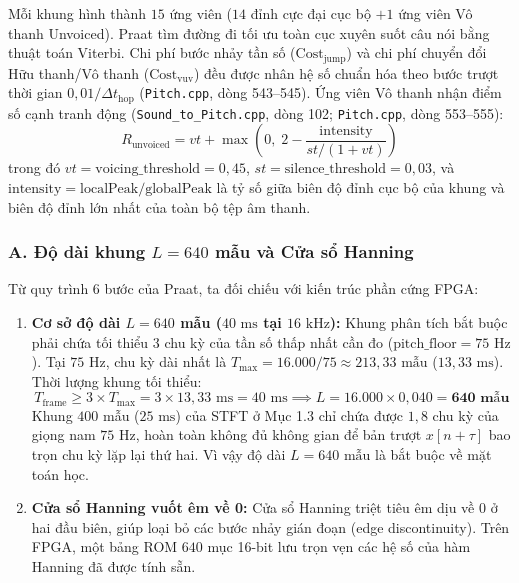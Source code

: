 \documentclass[11pt,a4paper]{article}
\begin{document}
\begin{enumerate}
    Mỗi khung hình thành $15$ ứng viên ($14$ đỉnh cực đại cục bộ $+ 1$ ứng viên Vô thanh Unvoiced). Praat tìm đường đi tối ưu toàn cục xuyên suốt câu nói bằng thuật toán Viterbi. Chi phí bước nhảy tần số ($\text{Cost}_{\text{jump}}$) và chi phí chuyển đổi Hữu thanh/Vô thanh ($\text{Cost}_{\text{vuv}}$) đều được nhân hệ số chuẩn hóa theo bước trượt thời gian $0{,}01 / \Delta t_{\text{hop}}$ (\texttt{Pitch.cpp}, dòng 543--545). Ứng viên Vô thanh nhận điểm số cạnh tranh động (\texttt{Sound\_to\_Pitch.cpp}, dòng 102; \texttt{Pitch.cpp}, dòng 553--555):
    \begin{equation}
    R_{\text{unvoiced}} = vt + \max\left(0, \; 2 - \frac{\text{intensity}}{st / (1 + vt)}\right)
    \label{eq:praat_unvoiced_dynamic}
    \end{equation}
    trong đó $vt = \text{voicing\_threshold} = 0{,}45$, $st = \text{silence\_threshold} = 0{,}03$, và $\text{intensity} = \text{localPeak} / \text{globalPeak}$ là tỷ số giữa biên độ đỉnh cục bộ của khung và biên độ đỉnh lớn nhất của toàn bộ tệp âm thanh.
\end{enumerate}

\subsubsection*{A. Độ dài khung $L = 640$ mẫu và Cửa sổ Hanning}

Từ quy trình 6 bước của Praat, ta đối chiếu với kiến trúc phần cứng FPGA:
\begin{enumerate}
    \setlength{\itemsep}{1pt}
    \item \textbf{Cơ sở độ dài $L = 640$ mẫu ($40\text{ ms}$ tại $16\text{ kHz}$):}
    Khung phân tích bắt buộc phải chứa tối thiểu $3$ chu kỳ của tần số thấp nhất cần đo ($\text{pitch\_floor} = 75\text{ Hz}$). Tại $75\text{ Hz}$, chu kỳ dài nhất là $T_{\max} = 16.000 / 75 \approx 213{,}33\text{ mẫu}$ ($13{,}33\text{ ms}$). Thời lượng khung tối thiểu:
    \[
    T_{\text{frame}} \ge 3 \times T_{\max} = 3 \times 13{,}33\text{ ms} = 40\text{ ms} \implies L = 16.000 \times 0{,}040 = \mathbf{640\text{ mẫu}}
    \]
    Khung $400$ mẫu ($25\text{ ms}$) của STFT ở Mục 1.3 chỉ chứa được $1{,}8$ chu kỳ của giọng nam $75\text{ Hz}$, hoàn toàn không đủ không gian để bản trượt $x[n+\tau]$ bao trọn chu kỳ lặp lại thứ hai. Vì vậy độ dài $L = 640\text{ mẫu}$ là bắt buộc về mặt toán học.
    \item \textbf{Cửa sổ Hanning vuốt êm về 0:}
    Cửa sổ Hanning triệt tiêu êm dịu về $0$ ở hai đầu biên, giúp loại bỏ các bước nhảy gián đoạn (edge discontinuity). Trên FPGA, một bảng ROM $640$ mục 16-bit lưu trọn vẹn các hệ số của hàm Hanning đã được tính sẵn.
\end{enumerate}
\end{document}
